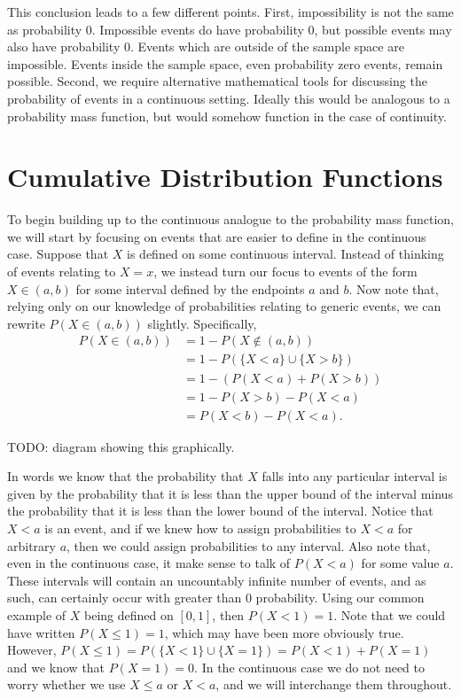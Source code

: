 \documentclass[
  letterpaper,
  DIV=11,
  numbers=noendperiod]{scrreprt}
\begin{document}
This conclusion leads to a few different points. First, impossibility is
not the same as probability \(0\). Impossible events do have probability
\(0\), but possible events may also have probability \(0\). Events which
are outside of the sample space are impossible. Events inside the sample
space, even probability zero events, remain possible. Second, we require
alternative mathematical tools for discussing the probability of events
in a continuous setting. Ideally this would be analogous to a
probability mass function, but would somehow function in the case of
continuity.

\section{Cumulative Distribution
Functions}\label{cumulative-distribution-functions}

To begin building up to the continuous analogue to the probability mass
function, we will start by focusing on events that are easier to define
in the continuous case. Suppose that \(X\) is defined on some continuous
interval. Instead of thinking of events relating to \(X=x\), we instead
turn our focus to events of the form \(X \in (a,b)\) for some interval
defined by the endpoints \(a\) and \(b\). Now note that, relying only on
our knowledge of probabilities relating to generic events, we can
rewrite \(P(X\in(a,b))\) slightly. Specifically, \begin{align*}
P(X\in(a,b)) &= 1 - P(X\not\in(a,b))\\
&= 1 - P(\{X < a\}\cup\{X > b\}) \\
&= 1 - \left(P(X < a) + P(X > b)\right)\\
&= 1 - P(X > b) - P(X < a)\\
&= P(X < b) - P(X < a).\end{align*}

TODO: diagram showing this graphically.

In words we know that the probability that \(X\) falls into any
particular interval is given by the probability that it is less than the
upper bound of the interval minus the probability that it is less than
the lower bound of the interval. Notice that \(X < a\) is an event, and
if we knew how to assign probabilities to \(X<a\) for arbitrary \(a\),
then we could assign probabilities to any interval. Also note that, even
in the continuous case, it make sense to talk of \(P(X < a)\) for some
value \(a\). These intervals will contain an uncountably infinite number
of events, and as such, can certainly occur with greater than \(0\)
probability. Using our common example of \(X\) being defined on
\([0,1]\), then \(P(X<1)=1\). Note that we could have written
\(P(X \leq 1) = 1\), which may have been more obviously true. However,
\(P(X\leq 1) = P(\{X<1\}\cup\{X=1\}) = P(X<1) + P(X=1)\) and we know
that \(P(X=1)=0\). In the continuous case we do not need to worry
whether we use \(X\leq a\) or \(X < a\), and we will interchange them
throughout.
\end{document}
